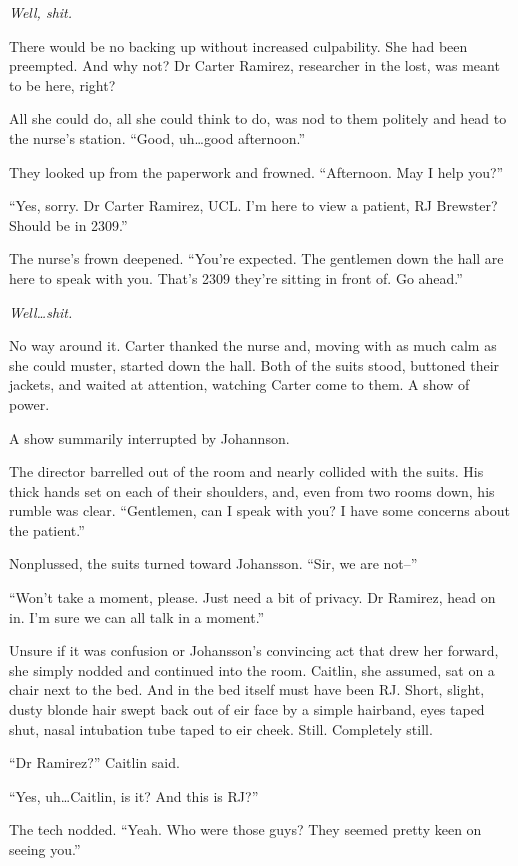 \emph{Well, shit.}

There would be no backing up without increased culpability. She had been preempted. And why not? Dr Carter Ramirez, researcher in the lost, was meant to be here, right?

All she could do, all she could think to do, was nod to them politely and head to the nurse's station. ``Good, uh\ldots{}good afternoon.''

They looked up from the paperwork and frowned. ``Afternoon. May I help you?''

``Yes, sorry. Dr Carter Ramirez, UCL. I'm here to view a patient, RJ Brewster? Should be in 2309.''

The nurse's frown deepened. ``You're expected. The gentlemen down the hall are here to speak with you. That's 2309 they're sitting in front of. Go ahead.''

\emph{Well\ldots{}shit.}

No way around it. Carter thanked the nurse and, moving with as much calm as she could muster, started down the hall. Both of the suits stood, buttoned their jackets, and waited at attention, watching Carter come to them. A show of power.

A show summarily interrupted by Johannson.

The director barrelled out of the room and nearly collided with the suits. His thick hands set on each of their shoulders, and, even from two rooms down, his rumble was clear. ``Gentlemen, can I speak with you? I have some concerns about the patient.''

Nonplussed, the suits turned toward Johansson. ``Sir, we are not--''

``Won't take a moment, please. Just need a bit of privacy. Dr Ramirez, head on in. I'm sure we can all talk in a moment.''

Unsure if it was confusion or Johansson's convincing act that drew her forward, she simply nodded and continued into the room. Caitlin, she assumed, sat on a chair next to the bed. And in the bed itself must have been RJ. Short, slight, dusty blonde hair swept back out of eir face by a simple hairband, eyes taped shut, nasal intubation tube taped to eir cheek. Still. Completely still.

``Dr Ramirez?'' Caitlin said.

``Yes, uh\ldots{}Caitlin, is it? And this is RJ?''

The tech nodded. ``Yeah. Who were those guys? They seemed pretty keen on seeing you.''

